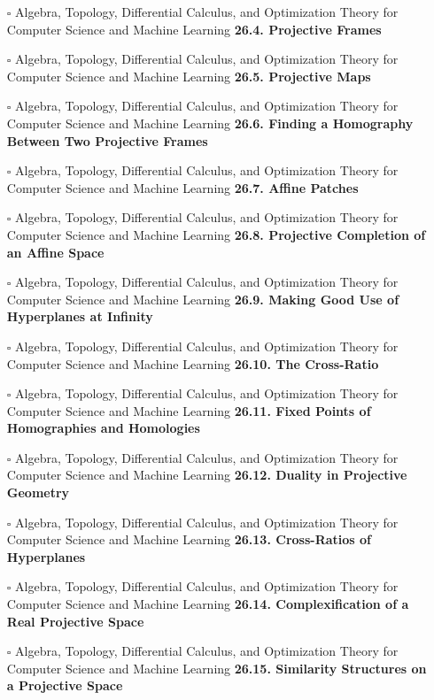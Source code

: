 \documentclass[a4, landscape, 12pt]{article}
\newcommand{\checkbox}{$\square$}%
\begin{document}
\begin{itemize}
{}
\item [\checkbox]  Algebra, Topology, Differential Calculus, and Optimization Theory for Computer Science and Machine Learning \textbf{ 26.4. Projective Frames
}
\item [\checkbox]  Algebra, Topology, Differential Calculus, and Optimization Theory for Computer Science and Machine Learning \textbf{ 26.5. Projective Maps
}
\item [\checkbox]  Algebra, Topology, Differential Calculus, and Optimization Theory for Computer Science and Machine Learning \textbf{ 26.6. Finding a Homography Between Two Projective Frames
}
\item [\checkbox]  Algebra, Topology, Differential Calculus, and Optimization Theory for Computer Science and Machine Learning \textbf{ 26.7. Affine Patches
}
\item [\checkbox]  Algebra, Topology, Differential Calculus, and Optimization Theory for Computer Science and Machine Learning \textbf{ 26.8. Projective Completion of an Affine Space
}
\item [\checkbox]  Algebra, Topology, Differential Calculus, and Optimization Theory for Computer Science and Machine Learning \textbf{ 26.9. Making Good Use of Hyperplanes at Infinity
}
\item [\checkbox]  Algebra, Topology, Differential Calculus, and Optimization Theory for Computer Science and Machine Learning \textbf{ 26.10. The Cross-Ratio
}
\item [\checkbox]  Algebra, Topology, Differential Calculus, and Optimization Theory for Computer Science and Machine Learning \textbf{ 26.11. Fixed Points of Homographies and Homologies
}
\item [\checkbox]  Algebra, Topology, Differential Calculus, and Optimization Theory for Computer Science and Machine Learning \textbf{ 26.12. Duality in Projective Geometry
}
\item [\checkbox]  Algebra, Topology, Differential Calculus, and Optimization Theory for Computer Science and Machine Learning \textbf{ 26.13. Cross-Ratios of Hyperplanes
}
\item [\checkbox]  Algebra, Topology, Differential Calculus, and Optimization Theory for Computer Science and Machine Learning \textbf{ 26.14. Complexification of a Real Projective Space
}
\item [\checkbox]  Algebra, Topology, Differential Calculus, and Optimization Theory for Computer Science and Machine Learning \textbf{ 26.15. Similarity Structures on a Projective Space
}
\end{itemize}
\end{document}
